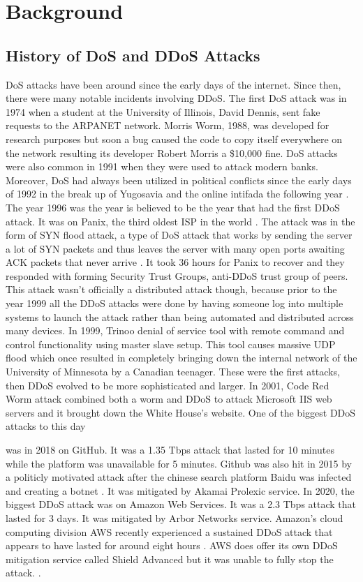 \documentclass[a4paper, 12pt]{report} %
\begin{document}
    \section{Background}
        \subsection{History of DoS and DDoS Attacks}
            DoS attacks have been around since the early days of the internet. Since then, there were many notable incidents involving DDoS. The first DoS attack was in 1974 when a student at the University of Illinois, David Dennis, sent fake requests to the ARPANET network. Morris Worm, 1988, was developed for research purposes but soon a bug caused the code to copy itself everywhere on the network resulting its developer Robert Morris a \$10,000 fine. DoS attacks were also common in 1991 when they were used to attack modern banks. Moreover, DoS had always been utilized in political conflicts since the early days of 1992 in the break up of Yugosavia and the online intifada the following year \cite{history_of_ddos}.
            The year 1996 was the year is believed to be the year that had the first DDoS attack. It was on Panix, the third oldest ISP in the world \cite{wikipediaDenialofserviceAttack}. The attack was in the form of SYN flood attack, a type of DoS attack that works by sending the server a lot of SYN packets and thus leaves the server with many open ports awaiting ACK packets that never arrive \cite{syn_flood_attack}. It took 36 hours for Panix to recover and they responded with forming Security Trust Groups, anti-DDoS trust group of peers. This attack wasn’t officially a distributed attack though, because prior to the year 1999 all the DDoS attacks were done by having someone log into multiple systems to launch the attack rather than being automated and distributed across many devices. In 1999, Trinoo denial of service tool with remote command and control functionality using master slave setup. This tool causes massive UDP flood which once resulted in completely bringing down the internal network of the University of Minnesota by a Canadian teenager. These were the first attacks, then DDoS evolved to be more sophisticated and larger. In 2001, Code Red Worm attack combined both a worm and DDoS to attack Microsoft IIS web servers and it brought down the White House's website. One of the biggest DDoS attacks to this day \date{\today} was in 2018 on GitHub. It was a 1.35 Tbps attack that lasted for 10 minutes while the platform was unavailable for 5 minutes. Github was also hit in 2015 by a politicly motivated attack after the chinese search platform Baidu was infected and creating a botnet \cite{history_of_ddos}. It was mitigated by Akamai Prolexic service. In 2020, the biggest DDoS attack was on Amazon Web Services. It was a 2.3 Tbps attack that lasted for 3 days. It was mitigated by Arbor Networks service. Amazon's cloud computing division AWS recently experienced a sustained DDoS attack that appears to have lasted for around eight hours \cite{a10networksLargestReported}. AWS does offer its own DDoS mitigation service called Shield Advanced but it was unable to fully stop the attack. \cite{amazonManagedDDoS}.
\end{document}
